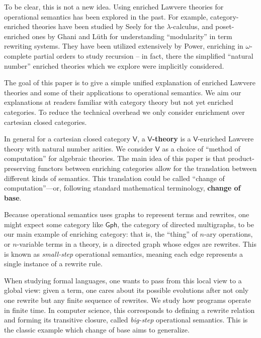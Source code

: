 \documentclass{amsart}
\theoremstyle{definition}
\newcommand{\Gph}{\mathsf{Gph}}
\newcommand{\V}{\mathsf{V}}
\begin{document}
To be clear, this is not a new idea. Using enriched Lawvere theories for operational semantics has been explored in the past. For example, category-enriched theories have been studied by Seely \cite{seely} for the $\lambda$-calculus, and poset-enriched ones by Ghani and L\"uth \cite{ghani} for understanding ``modularity'' in term rewriting systems.  They have been utilized extensively by Power, enriching in $\omega$-complete partial orders to study recursion \cite{compeffects} -- in fact, there the simplified ``natural number'' enriched theories which we explore were implicitly considered.

The goal of this paper is to give a simple unified explanation of enriched Lawvere theories and some of their applications to operational semantics.    We aim our explanations at readers familiar with category theory but not yet enriched categories.  To reduce the technical overhead we only consider enrichment over cartesian closed categories.

In general for a cartesian closed category $\V$, a \textbf{$\V$-theory} is a $\V$-enriched Lawvere theory with natural number arities. We consider $\V$ as a choice of ``method of computation'' for algebraic theories.  The main idea of this paper is that product-preserving functors between enriching categories allow for the translation between different kinds of semantics.   This translation could be called ``change of computation''---or, following standard mathematical terminology, \textbf{change of base}.

Because operational semantics uses graphs to represent terms and rewrites, one might expect some category like $\Gph$, the category of directed multigraphs, to be our main example of enriching category: that is, the ``thing'' of $n$-ary operations, or $n$-variable terms in a theory, is a directed graph whose edges are rewrites. This is known as \textit{small-step} operational semantics, meaning each edge represents a single instance of a rewrite rule.

When studying formal languages, one wants to pass from this local view to a global view: given a term, one cares about its possible evolutions after not only one rewrite but any finite sequence of rewrites. We study how programs operate in finite time.  In computer science, this corresponds to defining a rewrite relation and forming its transitive closure, called \textit{big-step} operational semantics. This is the classic example which change of base aims to generalize.
\end{document}
